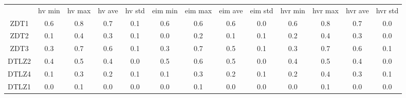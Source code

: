 \begin{tabular}{ccccccccccccc}
\hline
& hv min & hv max & hv ave & hv std & eim min & eim max & eim ave & eim std & hvr min & hvr max & hvr ave & hvr std \\
ZDT1 & 0.6 & 0.8 & 0.7 & 0.1 & 0.6 & 0.6 & 0.6 & 0.0 & 0.6 & 0.8 & 0.7 & 0.0 \\
ZDT2 & 0.1 & 0.4 & 0.3 & 0.1 & 0.0 & 0.2 & 0.1 & 0.1 & 0.2 & 0.4 & 0.3 & 0.0 \\
ZDT3 & 0.3 & 0.7 & 0.6 & 0.1 & 0.3 & 0.7 & 0.5 & 0.1 & 0.3 & 0.7 & 0.6 & 0.1 \\
DTLZ2 & 0.4 & 0.5 & 0.4 & 0.0 & 0.5 & 0.6 & 0.5 & 0.0 & 0.4 & 0.5 & 0.4 & 0.0 \\
DTLZ4 & 0.1 & 0.3 & 0.2 & 0.1 & 0.1 & 0.3 & 0.2 & 0.1 & 0.2 & 0.4 & 0.3 & 0.1 \\
DTLZ1 & 0.0 & 0.1 & 0.0 & 0.0 & 0.0 & 0.1 & 0.0 & 0.0 & 0.0 & 0.1 & 0.0 & 0.0 \\
\hline
\end{tabular}
